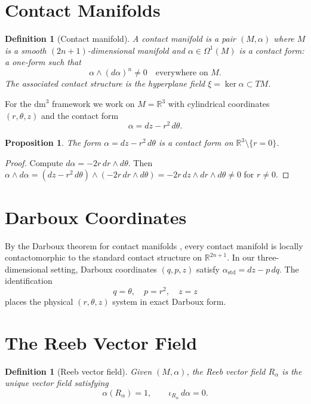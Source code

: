 \documentclass[11pt,a4paper,openright]{book}
\theoremstyle{dm3thm}
\newtheorem{proposition}[theorem]{Proposition}
\theoremstyle{dm3def}
\newtheorem{definition}[theorem]{Definition}
\newcommand{\dm}{\mathrm{dm}^3}
\newcommand{\Ralf}{R_\alpha}
\begin{document}
\section{Contact Manifolds}

\begin{definition}[Contact manifold]
A \emph{contact manifold} is a pair $(M,\alpha)$ where $M$ is a smooth
$(2n+1)$-dimensional manifold and $\alpha\in\Omega^1(M)$ is a \emph{contact
form}: a one-form such that
\[
  \alpha \wedge (d\alpha)^n \neq 0 \quad \text{everywhere on } M.
\]
The associated \emph{contact structure} is the hyperplane field
$\xi = \ker\alpha \subset TM$.
\end{definition}

For the $\dm$ framework we work on $M = \mathbb{R}^3$ with cylindrical
coordinates $(r,\theta,z)$ and the contact form
\begin{equation}\label{eq:contactform}
  \alpha = dz - r^2\,d\theta.
\end{equation}

\begin{proposition}
The form $\alpha = dz - r^2\,d\theta$ is a contact form on $\mathbb{R}^3\setminus\{r=0\}$.
\end{proposition}
\begin{proof}
Compute $d\alpha = -2r\,dr\wedge d\theta$.  Then
$\alpha\wedge d\alpha = (dz-r^2\,d\theta)\wedge(-2r\,dr\wedge d\theta)
= -2r\,dz\wedge dr\wedge d\theta \neq 0$ for $r\neq 0$.
\end{proof}

\section{Darboux Coordinates}

By the Darboux theorem for contact manifolds \citep{Geiges2008}, every contact
manifold is locally contactomorphic to the standard contact structure on
$\mathbb{R}^{2n+1}$.  In our three-dimensional setting, Darboux coordinates
$(q,p,z)$ satisfy $\alpha_{\mathrm{std}} = dz - p\,dq$.  The identification
\[
  q = \theta,\quad p = r^2,\quad z = z
\]
places the physical $(r,\theta,z)$ system in exact Darboux form.

\section{The Reeb Vector Field}

\begin{definition}[Reeb vector field]
Given $(M,\alpha)$, the \emph{Reeb vector field} $\Ralf$ is the unique vector
field satisfying
\[
  \alpha(\Ralf) = 1, \qquad \iota_{\Ralf}\,d\alpha = 0.
\]
\end{definition}
\end{document}
